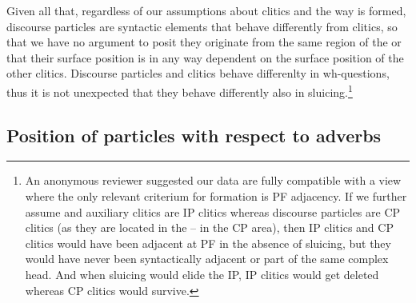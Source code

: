 \documentclass[output=paper,modfonts,newtxmath,hidelinks]{langscibook}
\begin{document}
\largerpage
\noindent Given all that, regardless of our assumptions about clitics and the way  is formed, discourse particles are syntactic elements that behave differently from clitics, so that we have no argument to posit they originate from the same region of the  or that their surface position is in any way dependent on the surface position of the other clitics. Discourse particles and clitics behave differenlty in wh-questions, thus it is not unexpected that they behave differently also in sluicing.\footnote{An anonymous reviewer suggested our data are fully compatible with a view where the only relevant criterium for  formation is PF adjacency. If we further assume  and auxiliary clitics are IP clitics whereas discourse particles are CP clitics (as they are located in the  -- in the CP area), then IP clitics and CP clitics would have been adjacent at PF in the absence of sluicing, but they would have never been syntactically adjacent or part of the same complex head. And when sluicing would elide the IP, IP clitics would get deleted whereas CP clitics would survive.} 


\subsection{Position of particles with respect to adverbs}
\end{document}
